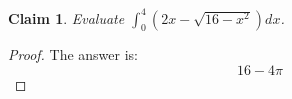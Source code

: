 \documentclass{article}
\newtheorem{theorem}{Claim}
\begin{document}
\begin{theorem}
Evaluate $\displaystyle{\int_0^4(2x-\sqrt{16-x^2})dx}$.
\end{theorem}

\begin{proof}
The answer is:
\[
16 - 4 \pi
\]
\end{proof}
\end{document}

